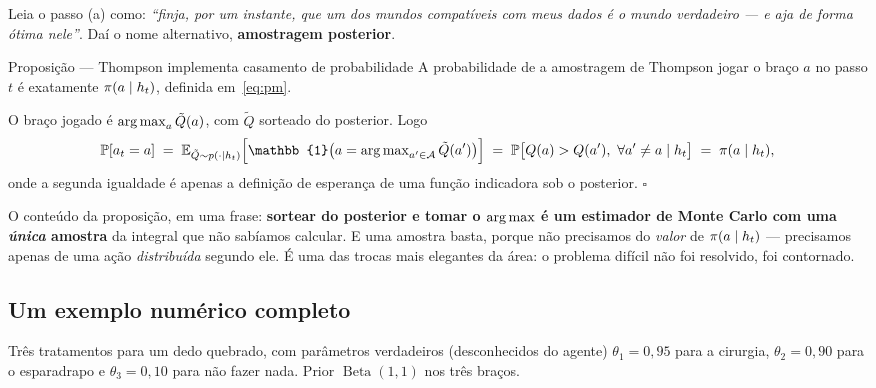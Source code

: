\documentclass[11pt, a4paper]{article}
\newcommand{\Bdist}{\operatorname{Beta}}
\newcommand{\hist}{h_t}
\newcommand{\Ind}{\mathbb{1}}
\begin{document}
\begin{ideiabox}
Leia o passo (a) como: \emph{``finja, por um instante, que um dos mundos
compatíveis com meus dados é o mundo verdadeiro — e aja de forma ótima nele''}.
Daí o nome alternativo, \textbf{amostragem posterior}.
\end{ideiabox}

\begin{teobox}{Proposição — Thompson implementa casamento de probabilidade}
A probabilidade de a amostragem de Thompson jogar o braço $a$ no passo $t$ é
exatamente $\pol(a\mid \hist)$, definida em~\eqref{eq:pm}.
\end{teobox}

\begin{provabox}
O braço jogado é $\operatorname*{arg\,max}_a \tilde Q(a)$, com $\tilde Q$ sorteado do posterior.
Logo
\[
  \Prob[a_t = a]
  \;=\;
  \E_{\tilde Q \sim p(\cdot\mid \hist)}
    \Big[\Ind\big(a = \argmax\nolimits_{a'\in\gA}\tilde Q(a')\big)\Big]
  \;=\;
  \Prob\big[Q(a) > Q(a'),\ \forall a'\neq a \mid \hist\big]
  \;=\;
  \pol(a\mid \hist),
\]
onde a segunda igualdade é apenas a definição de esperança de uma função
indicadora sob o posterior. $\square$
\end{provabox}

\begin{ideiabox}
O conteúdo da proposição, em uma frase: \textbf{sortear do posterior e tomar o
$\operatorname*{arg\,max}$ é um estimador de Monte Carlo com uma \emph{única} amostra} da
integral que não sabíamos calcular. E uma amostra basta, porque não precisamos
do \emph{valor} de $\pol(a\mid\hist)$ — precisamos apenas de uma ação
\emph{distribuída} segundo ele. É uma das trocas mais elegantes da área: o
problema difícil não foi resolvido, foi contornado.
\end{ideiabox}

\subsection*{Um exemplo numérico completo}

Três tratamentos para um dedo quebrado, com parâmetros verdadeiros
(desconhecidos do agente) $\theta_1 = 0{,}95$ para a cirurgia,
$\theta_2 = 0{,}90$ para o esparadrapo e $\theta_3 = 0{,}10$ para não fazer
nada. Prior $\Bdist(1,1)$ nos três braços.
\end{document}

